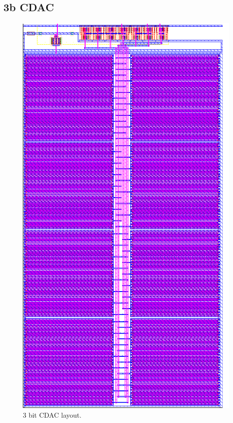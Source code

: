 		\subsection{3b CDAC}\label{sec:lay_cdac_3b}
			\begin{figure}[htb!]
			        \centering
			        \includegraphics[height=0.85\textheight, angle=0]{./figs/layout/layout_cdac_3b}
			    \caption{3 bit CDAC layout.}
			\end{figure}
		\FloatBarrier\pagebreak
